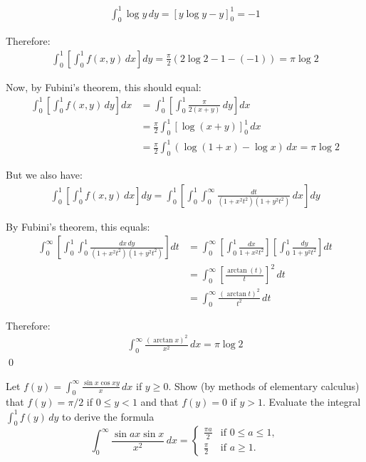 \begin{align*}
\int_{0}^{1} \log y \, dy = \left[y \log y - y\right]_{0}^{1} = -1
\end{align*}

Therefore:
\begin{align*}
\int_{0}^{1} \left[ \int_{0}^{1} f(x, y) \, dx \right] dy = \frac{\pi}{2} (2 \log 2 - 1 - (-1)) = \pi \log 2
\end{align*}

Now, by Fubini's theorem, this should equal:
\begin{align*}
\int_{0}^{1} \left[ \int_{0}^{1} f(x, y) \, dy \right] dx &= \int_{0}^{1} \left[ \int_{0}^{1} \frac{\pi}{2(x + y)} \, dy \right] dx \\
&= \frac{\pi}{2} \int_{0}^{1} \left[ \log(x + y) \right]_{0}^{1} \, dx \\
&= \frac{\pi}{2} \int_{0}^{1} (\log(1 + x) - \log x) \, dx = \pi \log 2
\end{align*}

But we also have:
\begin{align*}
\int_{0}^{1} \left[ \int_{0}^{1} f(x, y) \, dx \right] dy = \int_{0}^{1} \left[ \int_{0}^{1} \int_{0}^{\infty} \frac{dt}{(1 + x^{2}t^{2})(1 + y^{2}t^{2})} \, dx \right] dy
\end{align*}

By Fubini's theorem, this equals:
\begin{align*}
\int_{0}^{\infty} \left[ \int_{0}^{1} \int_{0}^{1} \frac{dx \, dy}{(1 + x^{2}t^{2})(1 + y^{2}t^{2})} \right] dt &= \int_{0}^{\infty} \left[ \int_{0}^{1} \frac{dx}{1 + x^{2}t^{2}} \right] \left[ \int_{0}^{1} \frac{dy}{1 + y^{2}t^{2}} \right] dt \\
&= \int_{0}^{\infty} \left[ \frac{\arctan(t)}{t} \right]^{2} \, dt \\
&= \int_{0}^{\infty} \frac{(\arctan t)^{2}}{t^{2}} \, dt
\end{align*}

Therefore:
\begin{align*}
\int_{0}^{\infty} \frac{(\arctan x)^{2}}{x^{2}} \, dx = \pi \log 2
\end{align*}\qed


\begin{problembox}
\begin{problemstatement}
Let $f(y) = \int_{0}^{\infty} \frac{\sin x \cos xy}{x} \, dx$ if $y \geq 0$. Show (by methods of elementary calculus) that $f(y) = \pi/2$ if $0 \leq y < 1$ and that $f(y) = 0$ if $y > 1$. Evaluate the integral $\int_{0}^{1} f(y) \, dy$ to derive the formula
\[\int_{0}^{\infty} \frac{\sin ax \sin x}{x^{2}} \, dx = \begin{cases} 
\frac{\pi a}{2} & \text{if } 0 \leq a \leq 1, \\
\frac{\pi}{2} & \text{if } a \geq 1.
\end{cases}\]
\end{problemstatement}
\end{problembox}


